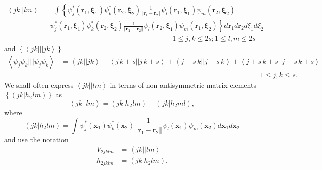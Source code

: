 \documentclass[aps,preprint]{revtex4}%
\begin{document}
\begin{align}
\left\langle jk||lm\right\rangle  &  =\int\left\{  \psi_{j}^{\ast}\left(
\mathbf{r}_{1}\mathbf{,\xi}_{1}\right)  \psi_{k}^{\ast}\left(  \mathbf{r}%
_{2}\mathbf{,\xi}_{2}\right)  \frac{1}{\left\Vert \mathbf{r}_{1}%
-\mathbf{r}_{2}\right\Vert }\psi_{l}\left(  \mathbf{r}_{1}\mathbf{,\xi}%
_{1}\right)  \psi_{m}\left(  \mathbf{r}_{2}\mathbf{,\xi}_{2}\right)  \right.
\nonumber\\
&  -\left.  \psi_{j}^{\ast}\left(  \mathbf{r}_{1}\mathbf{,\xi}_{1}\right)
\psi_{k}^{\ast}\left(  \mathbf{r}_{2}\mathbf{,\xi}_{2}\right)  \frac
{1}{\left\Vert \mathbf{r}_{1}-\mathbf{r}_{2}\right\Vert }\psi_{l}\left(
\mathbf{r}_{2}\mathbf{,\xi}_{1}\right)  \psi_{m}\left(  \mathbf{r}%
_{1}\mathbf{,\xi}_{2}\right)  \right\}  d\mathbf{r}_{1}d\mathbf{r}_{2}d\xi
_{1}d\xi_{2}\nonumber\\
&  \left.  {}\right.  \qquad\qquad\qquad\qquad\qquad\qquad\qquad\qquad
\qquad1\leq j,k\leq2s;1\leq l,m\leq2s \label{h2}%
\end{align}
and $\left\{  \left\langle jk|||jk\right\rangle \right\}  $
\begin{align}
\left\langle \psi_{j}\psi_{k}|||\psi_{j}\psi_{k}\right\rangle  &
=\left\langle jk||jk\right\rangle +\left\langle j\,k+s||j\,k+s\right\rangle
+\left\langle j+s\,k||j+s\,k\right\rangle +\left\langle
j+s\,k+s||j+s\,k+s\right\rangle \nonumber\\
&  \left.  {}\right.  \qquad\qquad\qquad\qquad\qquad\qquad\qquad\qquad
\qquad\qquad\qquad\qquad\qquad\qquad1\leq j,k\leq s.
\end{align}
We shall often express $\left\langle jk||lm\right\rangle $ in terms of non
antisymmetric matrix elements $\left\{  \left(  \left.  jk\right\vert
h_{2}lm\right)  \right\}  $ as
\begin{equation}
\left\langle jk||lm\right\rangle =\left(  \left.  jk\right\vert h_{2}%
lm\right)  -\left(  \left.  jk\right\vert h_{2}ml\right)  ,
\end{equation}
where
\begin{equation}
\left(  \left.  jk\right\vert h_{2}lm\right)  =\int\psi_{j}^{\ast}\left(
\mathbf{x}_{1}\right)  \psi_{k}^{\ast}\left(  \mathbf{x}_{2}\right)  \frac
{1}{\left\Vert \mathbf{r}_{1}-\mathbf{r}_{2}\right\Vert }\psi_{l}\left(
\mathbf{x}_{1}\right)  \psi_{m}\left(  \mathbf{x}_{2}\right)  d\mathbf{x}%
_{1}d\mathbf{x}_{2}%
\end{equation}
and use the notation
\begin{align}
V_{2jklm}  &  =\left\langle jk||lm\right\rangle \nonumber\\
h_{2jklm}  &  =\left(  \left.  jk\right\vert h_{2}lm\right)  .
\end{align}
\end{document}
